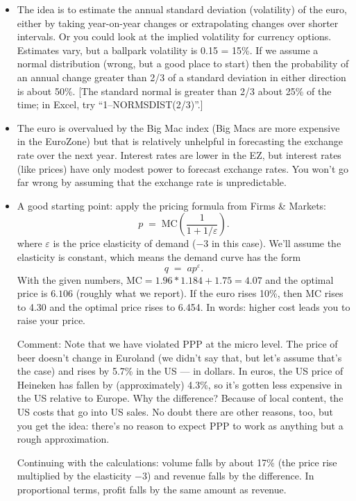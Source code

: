\documentclass[letterpaper,12pt]{article}
\begin{document}
\begin{itemize}

\item The idea is to estimate the annual standard deviation (volatility)  of the euro, 
either by taking year-on-year changes or extrapolating changes 
over shorter intervals.  
Or you could look at the implied volatility for currency options.  
Estimates vary, but a ballpark volatility is 0.15 = 15\%.  
If we assume a normal distribution (wrong, but a good place to start) 
then the probability of an annual change greater than 2/3 of a standard deviation in either direction is about 50\%.  
[The standard normal is greater than 2/3 about 25\% of the time;
in Excel, try ``1--NORMSDIST(2/3)''.]

\item The euro is overvalued by the Big Mac index (Big Macs are 
more expensive in the EuroZone) but that is relatively 
unhelpful in forecasting the exchange rate over the next year.  
Interest rates are lower in the EZ, but interest rates (like prices) 
have only modest power to forecast exchange rates.  
You won't go far wrong by assuming that the exchange rate is unpredictable.  

\item A good starting point:  
apply the pricing formula from Firms \& Markets:  
\[
    p  \;=\;  \mbox{MC} \left( \frac{1} {1+1/\varepsilon} \right) .
\]
where $\varepsilon$ is the price elasticity of demand ($-3$ in this case).  
We'll assume the elasticity is constant, which means the demand curve has the form 
\[
    q \;=\; a p^{\displaystyle \varepsilon} .
\]
With the given numbers, $\mbox{MC} = 1.96*1.184 + 1.75 = 4.07$ 
and the optimal price is $ 6.106$ (roughly what we report).  
If the euro rises 10\%, then $\mbox{MC}$ rises to 4.30 and the optimal price 
rises to 6.454.  
In words:  higher cost leads you to raise your price.  

Comment:  Note that we have violated PPP at the micro level.  
The price of beer doesn't change in Euroland (we didn't say that, but let's 
assume that's the case) and rises by 5.7\% in the US --- in dollars. 
In euros, the US price of Heineken has fallen by (approximately) 4.3\%,
so it's gotten less expensive in the US relative to Europe.  
Why the difference?  Because of local content, 
the US costs that go into US sales.  
No doubt there are other reasons, too, but you get the idea:  
there's no reason to expect 
PPP to work as anything but a rough approximation.  

Continuing with the calculations: volume falls by about 17\%  
(the price rise multiplied by the elasticity $-3$) and revenue 
falls by the difference.  
In proportional terms, profit falls by the same amount as revenue.  


\end{itemize}
\end{document}
